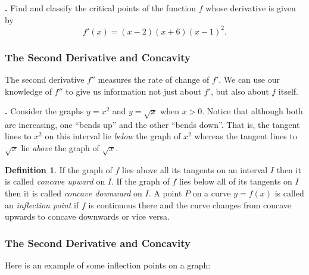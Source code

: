 \documentclass[t]{beamer}
\theoremstyle{plain}
\theoremstyle{definition}
\newtheorem{dfn}{Definition}
\newcounter{heading}
\newcommand{\newhead}[1]{\medskip\stepcounter{heading}\noindent\textbf{\hspace{0.2cm}{#1}.}}
\begin{document}
\begin{frame}
\newhead{Example} Find and classify the critical points of the function $f$ whose derivative is given by
\[f'(x)=(x-2)(x+6)(x-1)^2.\]
\end{frame}

\begin{frame}
\frametitle{The Second Derivative and Concavity}

\noindent The second derivative $f''$ measures the rate of change of $f'$.  We can use our knowledge of $f''$ to give us information not just about $f'$, but also about $f$ itself.\pause

\newhead{Example} Consider the graphs  $y=x^{2}$ and $y=\sqrt{x}$ when $x>0$.  Notice that although both are increasing, one ``bends up'' and the other ``bends down''.  That is, the tangent lines to $x^{2}$ on this interval lie \emph{below} the graph of $x^{2}$ whereas the tangent lines to $\sqrt{x}$ lie \emph{above} the graph of $\sqrt{x}$.\pause



\begin{dfn} If the graph of $f$ lies above all its tangents on an interval $I$ then it is called \emph{concave upward} on $I$.  If the graph of $f$ lies below all of its tangents on $I$ then it is called \emph{concave downward} on $I$.  A point $P$ on a curve $y=f(x)$ is called an \emph{inflection point} if $f$ is continuous there and the curve changes from concave upwards to concave downwards or vice versa.\end{dfn}
\end{frame}

\begin{frame}[t]
\frametitle{The Second Derivative and Concavity}
\noindent Here is an example of some inflection points on a graph:


\begin{center}
\end{center}
\end{frame}
\end{document}
